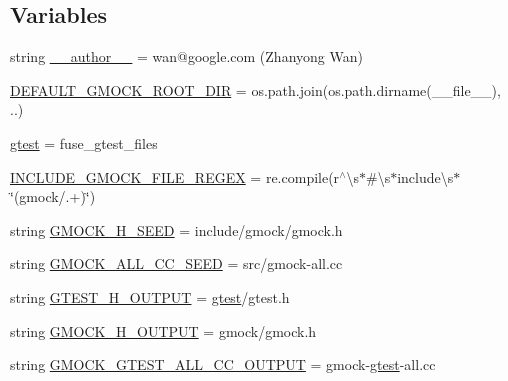\subsection*{Variables}
\begin{DoxyCompactItemize}
\item 
string \hyperlink{namespacefuse__gmock__files_abbec91475e2948cd4528a04cc3b19d18}{\+\_\+\+\_\+author\+\_\+\+\_\+} = \textquotesingle{}wan@google.\+com (Zhanyong Wan)\textquotesingle{}
\item 
\hyperlink{namespacefuse__gmock__files_a900b64b34e20c7430b72252192a3c7ed}{D\+E\+F\+A\+U\+L\+T\+\_\+\+G\+M\+O\+C\+K\+\_\+\+R\+O\+O\+T\+\_\+\+D\+IR} = os.\+path.\+join(os.\+path.\+dirname(\+\_\+\+\_\+file\+\_\+\+\_\+), \textquotesingle{}..\textquotesingle{})
\item 
\hyperlink{namespacefuse__gmock__files_a3fb36dbe8d361f9ecc54e1aa4b94b068}{gtest} = fuse\+\_\+gtest\+\_\+files
\item 
\hyperlink{namespacefuse__gmock__files_aeb4457451f878d6bc8a42f7ff3e5f6cf}{I\+N\+C\+L\+U\+D\+E\+\_\+\+G\+M\+O\+C\+K\+\_\+\+F\+I\+L\+E\+\_\+\+R\+E\+G\+EX} = re.\+compile(r\textquotesingle{}$^\wedge$\textbackslash{}s$\ast$\#\textbackslash{}s$\ast$include\textbackslash{}s$\ast$\char`\"{}(gmock/.+)\char`\"{}\textquotesingle{})
\item 
string \hyperlink{namespacefuse__gmock__files_aa31b816a9048fb3fa9d482eeac69c139}{G\+M\+O\+C\+K\+\_\+\+H\+\_\+\+S\+E\+ED} = \textquotesingle{}include/gmock/gmock.\+h\textquotesingle{}
\item 
string \hyperlink{namespacefuse__gmock__files_a518e1f3cc3f184747e6ed3f2d0233c99}{G\+M\+O\+C\+K\+\_\+\+A\+L\+L\+\_\+\+C\+C\+\_\+\+S\+E\+ED} = \textquotesingle{}src/gmock-\/all.\+cc\textquotesingle{}
\item 
string \hyperlink{namespacefuse__gmock__files_a385c31d8542b0a2e4b7f46cb2a32d7da}{G\+T\+E\+S\+T\+\_\+\+H\+\_\+\+O\+U\+T\+P\+UT} = \textquotesingle{}\hyperlink{namespacefuse__gmock__files_a3fb36dbe8d361f9ecc54e1aa4b94b068}{gtest}/gtest.\+h\textquotesingle{}
\item 
string \hyperlink{namespacefuse__gmock__files_aba0664abeb60f34cfdf59e8475a465d0}{G\+M\+O\+C\+K\+\_\+\+H\+\_\+\+O\+U\+T\+P\+UT} = \textquotesingle{}gmock/gmock.\+h\textquotesingle{}
\item 
string \hyperlink{namespacefuse__gmock__files_a9759f3f6c404e3292c26c9317792e846}{G\+M\+O\+C\+K\+\_\+\+G\+T\+E\+S\+T\+\_\+\+A\+L\+L\+\_\+\+C\+C\+\_\+\+O\+U\+T\+P\+UT} = \textquotesingle{}gmock-\/\hyperlink{namespacefuse__gmock__files_a3fb36dbe8d361f9ecc54e1aa4b94b068}{gtest}-\/all.\+cc\textquotesingle{}
\end{DoxyCompactItemize}


